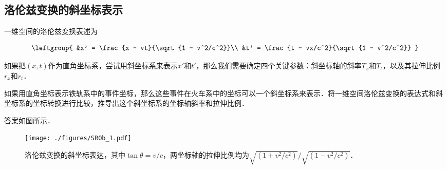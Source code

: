 
\subsection{洛伦兹变换的斜坐标表示}

一维空间的洛伦兹变换表述为

\begin{equation}\label{SROb_eq1}
\leftgroup{
&x' = \frac{x - vt}{\sqrt{1 - v^2/c^2}}\\
&t' = \frac{t - vx/c^2}{\sqrt{1 - v^2/c^2}}
}
\end{equation}

如果把$(x,t)$作为直角坐标系，尝试用斜坐标系来表示$x'$和$t'$，那么我们需要确定四个关键参数：斜坐标轴的斜率$T_x$和$T_t$，以及其拉伸比例$r_x$和$r_t$．

\begin{exercise}{}

如果用直角坐标表示铁轨系中的事件坐标，那么这些事件在火车系中的坐标可以一个斜坐标系来表示．将一维空间洛伦兹变换的表达式和斜坐标系的坐标转换进行比较，推导出这个斜坐标系的坐标轴斜率和拉伸比例．

\end{exercise}

答案如图所示．

\begin{figure}[ht]
\centering
\texttt{[image: ./figures/SROb\_1.pdf]}
\caption{洛伦兹变换的斜坐标表达，其中$\tan{\theta}=v/c$，两坐标轴的拉伸比例均为$\sqrt{(1+v^2/c^2)}/\sqrt{(1-v^2/c^2)}$．} \label{SROb_fig1}
\end{figure}




